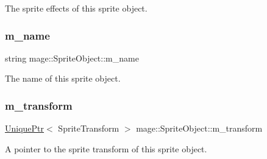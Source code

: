 The sprite effects of this sprite object. \hypertarget{classmage_1_1_sprite_object_a6f2a859e40ed391909bb4c87a8b74480}{}\label{classmage_1_1_sprite_object_a6f2a859e40ed391909bb4c87a8b74480} 
\subsubsection{\texorpdfstring{m\+\_\+name}{m\_name}}
{\footnotesize\ttfamily string mage\+::\+Sprite\+Object\+::m\+\_\+name\hspace{0.3cm}{\ttfamily [private]}}

The name of this sprite object. \hypertarget{classmage_1_1_sprite_object_a9523ae6f081a8fde3cbb3558f6e327da}{}\label{classmage_1_1_sprite_object_a9523ae6f081a8fde3cbb3558f6e327da} 
\subsubsection{\texorpdfstring{m\+\_\+transform}{m\_transform}}
{\footnotesize\ttfamily \hyperlink{namespacemage_a3316d7143a973e37adf1110f2e80ca31}{Unique\+Ptr}$<$ Sprite\+Transform $>$ mage\+::\+Sprite\+Object\+::m\+\_\+transform\hspace{0.3cm}{\ttfamily [private]}}

A pointer to the sprite transform of this sprite object. 
